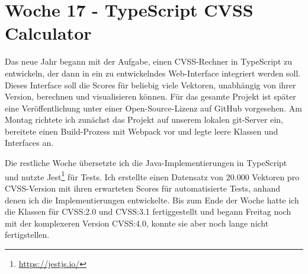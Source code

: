 \section{Woche 17 - TypeScript CVSS Calculator} \label{sec:bericht-wo-17}


\lweekdaymarginpar{\weekdayMondayLong}

Das neue Jahr begann mit der Aufgabe, einen CVSS-Rechner in TypeScript zu entwickeln, der dann in ein zu entwickelndes Web-Interface integriert werden soll.
Dieses Interface soll die Scores für beliebig viele Vektoren, unabhängig von ihrer Version, berechnen und visualisieren können.
Für das gesamte Projekt ist später eine Veröffentlichung unter einer Open-Source-Lizenz auf GitHub vorgesehen.
Am Montag richtete ich zunächst das Projekt auf unserem lokalen git-Server ein, bereitete einen Build-Prozess mit Webpack vor und legte leere Klassen und Interfaces an.

\sweekdaymarginpar{\weekdayTuesdayShort\ - \weekdayFridayShort}

Die restliche Woche übersetzte ich die Java-Implementierungen in TypeScript und nutzte Jest\footnote{\url{https://jestjs.io/}} für Tests.
Ich erstellte einen Datensatz von 20.000 Vektoren pro CVSS-Version mit ihren erwarteten Scores für automatisierte Tests, anhand denen ich die Implementierungen entwickelte.
Bis zum Ende der Woche hatte ich die Klassen für CVSS:2.0 und CVSS:3.1 fertiggestellt und begann Freitag noch mit der komplexeren Version CVSS:4.0, konnte sie aber noch lange nicht fertigstellen.
